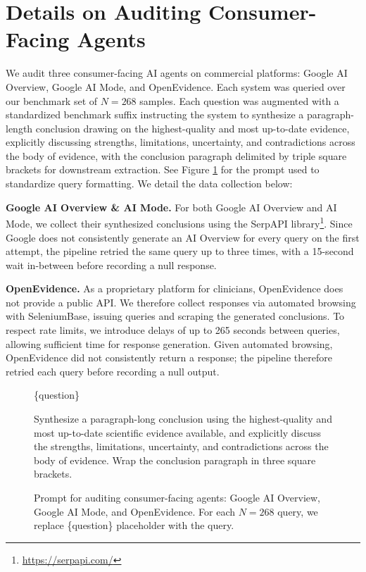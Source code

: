 \documentclass{article}
\newcommand{\xhdr}[1]{%
  \noindent\textbf{#1.}
}
\begin{document}
\clearpage

\section{Details on Auditing Consumer-Facing Agents}\label{appendix:audit-details}

We audit three consumer-facing AI agents on commercial platforms: Google AI Overview, Google AI Mode, and OpenEvidence. Each system was queried over our benchmark set of $N = 268$ samples. Each question was augmented with a standardized benchmark suffix instructing the system to synthesize a paragraph-length conclusion drawing on the highest-quality and most up-to-date evidence, explicitly discussing strengths, limitations, uncertainty, and contradictions across the body of evidence, with the conclusion paragraph delimited by triple square brackets for downstream extraction. See Figure \ref{fig:audit-prompt} for the prompt used to standardize query formatting. We detail the data collection below: 

\xhdr{Google AI Overview \& AI Mode} For both Google AI Overview and AI Mode, we collect their synthesized conclusions using the SerpAPI library\footnote{\url{https://serpapi.com/}}. Since Google does not consistently generate an AI Overview for every query on the first attempt, the pipeline retried the same query up to three times, with a 15-second wait in-between before recording a null response. 

\xhdr{OpenEvidence} As a proprietary platform for clinicians, OpenEvidence does not provide a public API. We therefore collect responses via automated browsing with SeleniumBase, issuing queries and scraping the generated conclusions. To respect rate limits, we introduce delays of up to 265 seconds between queries, allowing sufficient time for response generation. Given automated browsing, OpenEvidence did not consistently return a response; the pipeline therefore retried each query before recording a null output.

\begin{figure}[h]
\begin{small}
\centering
\begin{tcolorbox}[
    colback=gray!5,
    colframe=black,
    width=\linewidth,
    arc=2mm,
    boxrule=0.5pt,
    title=\textbf{Audit Prompt}
]
\{question\}

Synthesize a paragraph-long conclusion using the highest-quality and most up-to-date scientific evidence available, and explicitly discuss the strengths, limitations, uncertainty, and contradictions across the body of evidence. Wrap the conclusion paragraph in three square brackets.
\end{tcolorbox}

\caption{Prompt for auditing consumer-facing agents: Google AI Overview, Google AI Mode, and OpenEvidence. For each $N=268$ query, we replace \{question\} placeholder with the query.}
\label{fig:audit-prompt}
\end{small}
\end{figure}

\clearpage






\end{document}
